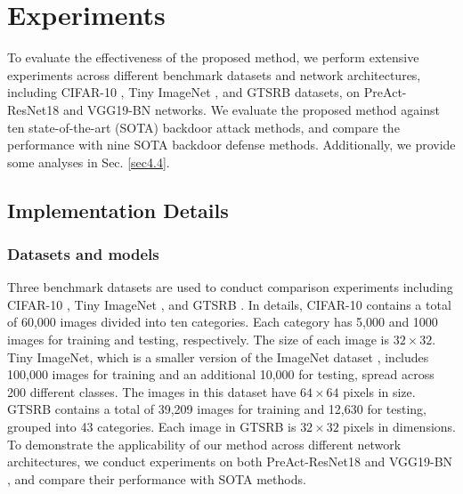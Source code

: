 \section{Experiments\label{sec4}}


To evaluate the effectiveness of the proposed method, we perform extensive experiments across different benchmark datasets and network architectures, including CIFAR-10 \cite{krizhevsky2009learning}, Tiny ImageNet \cite{le2015tiny}, and GTSRB \cite{stallkamp2011german} datasets, on PreAct-ResNet18 \cite{he2016identity} and VGG19-BN \cite{simonyan2014very} networks. We evaluate the proposed method against ten state-of-the-art (SOTA) backdoor attack methods, and compare the performance with nine SOTA backdoor defense methods. Additionally, we provide some analyses in Sec. \ref{sec4.4}.

\subsection{Implementation Details}
\subsubsection{Datasets and models}
Three benchmark datasets \cite{wubackdoorbench} are used to conduct comparison experiments including CIFAR-10 \cite{krizhevsky2009learning}, Tiny ImageNet \cite{le2015tiny}, and GTSRB \cite{stallkamp2011german}. In details, 
CIFAR-10 contains a total of 60,000 images divided into ten categories. Each category has 5,000 and 1000 images for training and testing, respectively. The size of each image is $32 \times 32$.
Tiny ImageNet, which is a smaller version of the ImageNet dataset \cite{deng2009imagenet}, includes 100,000 images for training and an additional 10,000 for testing, spread across 200 different classes. The images in this dataset have $64 \times 64$ pixels in size.
GTSRB contains a total of 39,209 images for training and 12,630 for testing, grouped into 43 categories. Each image in GTSRB is $32 \times 32$ pixels in dimensions.
To demonstrate the applicability of our method across different network architectures, we conduct experiments on both PreAct-ResNet18 \cite{he2016identity} and VGG19-BN \cite{simonyan2014very}, and compare their performance with SOTA methods.


